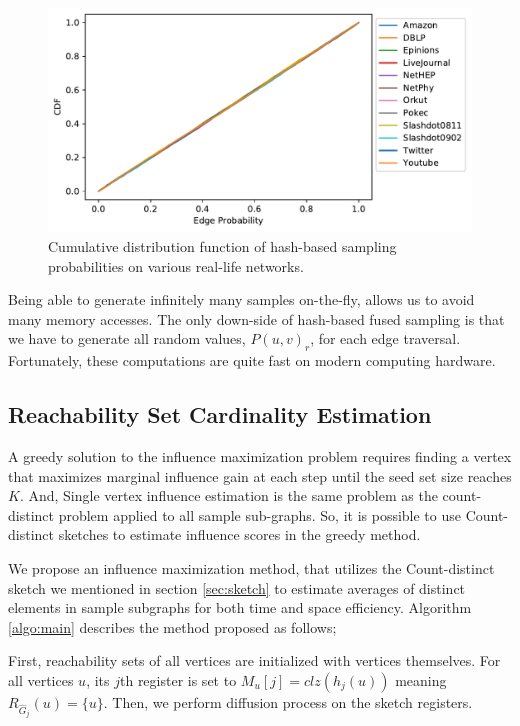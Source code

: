 \documentclass[10pt,journal,compsoc]{IEEEtran}
\begin{document}
\begin{figure}[!ht] 
    \centering
    \includegraphics[width=1\linewidth]{./images/cdf.pdf}
    \caption{Cumulative distribution function of hash-based sampling probabilities on various real-life networks.}
    \label{fig:prob_cdf} 
\end{figure}

Being able to generate infinitely many samples on-the-fly, allows us to avoid many memory accesses. The only down-side of hash-based fused sampling is that we have to generate all random values,   $P(u,v)_r$, for each edge traversal.  Fortunately, these computations are quite fast on modern computing hardware.

\subsection{Reachability Set Cardinality Estimation}
A greedy solution to the influence maximization problem requires finding a vertex that maximizes marginal influence gain at each step until the seed set size reaches $K$. And, Single vertex influence estimation is the same problem as the count-distinct problem applied to all sample sub-graphs. So, it is possible to use Count-distinct sketches to estimate influence scores in the greedy method. 

We propose an influence maximization method, that utilizes the Count-distinct sketch we mentioned in section \ref{sec:sketch} to estimate averages of distinct elements in sample subgraphs for both time and space efficiency. Algorithm \ref{algo:main} describes the method proposed as follows; 

First, reachability sets of all vertices are initialized with vertices themselves. For all vertices $u$, its $j$th register is set to $M_u[j]=clz(h_j(u))$ meaning $R_{\hat{G}_j}(u) = \{u\}$. Then, we perform diffusion process on the sketch registers. 
\end{document}

